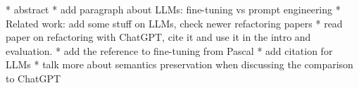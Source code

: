 * abstract
* add paragraph about LLMs: fine-tuning vs prompt engineering
* Related work: add some stuff on LLMs, check newer refactoring papers
* read paper on refactoring with ChatGPT, cite it and use it in the intro and evaluation.
* add the reference to fine-tuning from Pascal
* add citation for LLMs
* talk more about semantics preservation when discussing the comparison to ChatGPT

